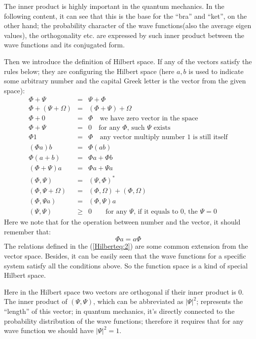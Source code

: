 The inner product is highly important in the quantum mechanics. In
the following content, it can see that this is the base for the
``bra'' and ``ket'', on the other hand; the probability character of
the wave functions(also the average eigen values), the orthogonality
etc. are expressed by such inner product between the wave functions
and its conjugated form.

Then we introduce the definition of Hilbert space. If any of the
vectors satisfy the rules below; they are configuring the Hilbert
space (here $a, b$ is used to indicate some arbitrary number and the
capital Greek letter is the vector from the given space):
\begin{eqnarray}
\label{Hilberteq:2}
  \Phi + \Psi &=& \Psi + \Phi \nonumber \\
  \Phi + (\Psi + \Omega) &=& (\Phi + \Psi) + \Omega \nonumber \\
  \Phi + 0 &=& \Phi  \quad
  \text{we have zero vector in the space} \nonumber \\
  \Phi + \Psi &=& 0  \quad
  \text{for any $\Phi$, such $\Psi$ exists} \nonumber \\
  \Phi 1 &=& \Phi  \quad
  \text{any vector multiply number 1 is still itself} \nonumber \\
  (\Phi a)b &=& \Phi(ab) \nonumber \\
    \Phi (a+b) &=& \Phi a+ \Phi b \nonumber \\
      (\Phi + \Psi)a &=& \Phi a + \Psi a \nonumber \\
  (\Phi,\Psi) &=& (\Psi, \Phi)^{*} \nonumber \\
  (\Phi,\Psi + \Omega) &=&  (\Phi,\Omega) + (\Phi,\Omega)\nonumber \\
  (\Phi,\Psi a) &=& (\Phi,\Psi)a \nonumber \\
  (\Psi,\Psi) & \geq& 0 \qquad
  \text{for any $\Psi$, if it equals to 0, the $\Psi = 0$ }
\end{eqnarray}
Here we note that for the operation between number and the vector,
it should remember that:
\begin{equation}\label{}
\Phi a = a\Phi
\end{equation}
The relations defined in the (\ref{Hilberteq:2}) are some common
extension from the vector space. Besides, it can be easily seen that
the wave functions for a specific system satisfy all the conditions
above. So the function space is a kind of special Hilbert space.

Here in the Hilbert space two vectors are orthogonal if their inner
product is 0. The inner product of $(\Psi,\Psi)$, which can be
abbreviated as $|\Psi|^{2}$; represents the ``length'' of this
vector; in quantum mechanics, it's directly connected to the
probability distribution of the wave functions; therefore it
requires that for any wave function we should have $|\Psi|^{2} = 1$.

